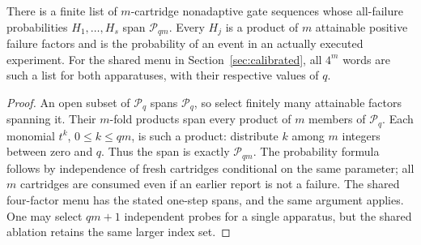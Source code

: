 \begin{lemma}\label{lem:probe-span}
There is a finite list of $m$-cartridge nonadaptive gate sequences whose
all-failure probabilities $H_1,\ldots,H_s$ span $\mathcal P_{qm}$. Every
$H_j$ is a product of $m$ attainable positive failure factors and is the
probability of an event in an actually executed experiment. For the shared
menu in Section~\ref{sec:calibrated}, all $4^m$ words are such a list for
both apparatuses, with their respective values of $q$.
\end{lemma}
\begin{proof}
An open subset of $\mathcal P_q$ spans $\mathcal P_q$, so select finitely
many attainable factors spanning it. Their $m$-fold products span every
product of $m$ members of $\mathcal P_q$. Each monomial $t^k$, $0\le k\le qm$,
is such a product: distribute $k$ among $m$ integers between zero and $q$.
Thus the span is exactly $\mathcal P_{qm}$. The probability formula follows
by independence of fresh cartridges conditional on the same parameter;
all $m$ cartridges are consumed even if an earlier report is not a failure.
The shared four-factor menu has the stated one-step spans, and the same
argument applies. One may select $qm+1$ independent probes for a single
apparatus, but the shared ablation retains the same larger index set.
\end{proof}


